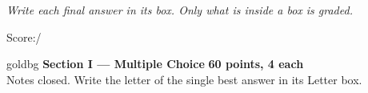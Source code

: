\documentclass[12pt]{article}
\begin{document}
{\small\itshape Write each final answer in its box. Only what is inside a box is graded.}\par

\hfill\small Score:\;\blank{1.3cm}\;/\normalsize
\vspace{0.04in}

\boxguard[6]
\begin{headlinebox}{goldbg}
\small
\textbf{Section I --- Multiple Choice} \hfill \textbf{60 points, 4 each}\\
Notes closed. Write the letter of the single best answer in its Letter box.
\end{headlinebox}

\vspace{0.06in}
\end{document}
